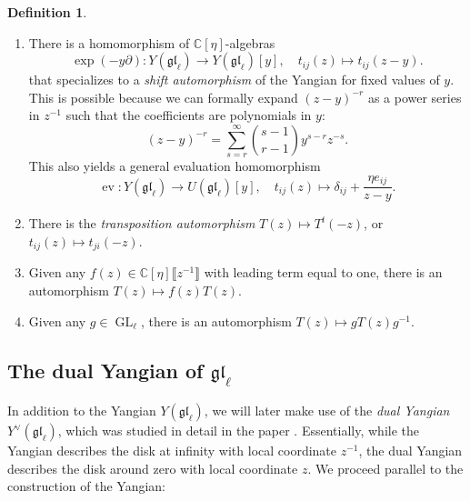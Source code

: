 \documentclass[11pt]{report}
\theoremstyle{definition}
\newtheorem{definition}[theorem]{Definition}
\theoremstyle{remark}
\theoremstyle{remark}
\newcommand{\C}{\mathbb{C}}
\begin{document}
\begin{definition}
\begin{enumerate}[label=(\roman*)]
\item There is a homomorphism of $\C[\eta]$-algebras
\begin{equation*}
\exp(-y\partial): Y(\mathfrak{gl}_\ell) \to Y(\mathfrak{gl}_\ell)[y], \quad t_{ij}(z) \mapsto t_{ij}(z-y).
\end{equation*}
that specializes to a \emph{shift automorphism} of the Yangian for fixed values of $y$. This is possible because we can formally expand $(z-y)^{-r}$ as a power series in $z^{-1}$ such that the coefficients are polynomials in $y$:
\begin{equation*}
(z-y)^{-r} = \sum_{s=r}^\infty {s-1 \choose r-1} y^{s-r} z^{-s}.
\end{equation*}
This also yields a general evaluation homomorphism
\begin{equation*}
\operatorname{ev}: Y(\mathfrak{gl}_\ell) \to U(\mathfrak{gl}_\ell)[y], \quad t_{ij}(z) \mapsto \delta_{ij} + \frac{\eta e_{ij}}{z-y}.
\end{equation*}
\item There is the \emph{transposition automorphism} $T(z) \mapsto T^t(-z)$, or $t_{ij}(z) \mapsto t_{ji}(-z)$.
\item Given any $f(z) \in \C[\eta]\llbracket z^{-1} \rrbracket$ with leading term equal to one, there is an automorphism $T(z) \mapsto f(z) T(z)$.
\item Given any $g \in \operatorname{GL}_\ell$, there is an automorphism $T(z) \mapsto g T(z) g^{-1}$.
\end{enumerate}
\end{definition}

\subsection{The dual Yangian of $\mathfrak{gl}_\ell$}

In addition to the Yangian $Y(\mathfrak{gl}_\ell)$, we will later make use of the \emph{dual Yangian} $Y^\vee(\mathfrak{gl}_\ell)$, which was studied in detail in the paper \cite{article:nazarov:2019}. Essentially, while the Yangian describes the disk at infinity with local coordinate $z^{-1}$, the dual Yangian describes the disk around zero with local coordinate $z$. We proceed parallel to the construction of the Yangian:
\end{document}
